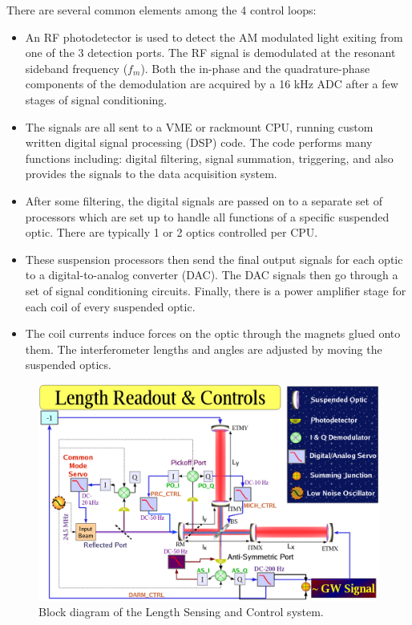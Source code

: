 There are several common elements among the 4 control loops:

\begin{itemize}
\item An RF photodetector is used to detect the AM modulated light
      exiting from one of the 3 detection ports. The RF signal is
      demodulated at the resonant sideband frequency ($f_{m}$).
      Both the in-phase and the quadrature-phase components of the
      demodulation are acquired by a 16 kHz ADC after a few stages
      of signal conditioning.

\item The signals are all sent to a VME or rackmount CPU, running custom
      written digital signal processing (DSP) code. The code performs
      many functions including: digital filtering, signal summation,
      triggering, and also provides the signals to the  data 
      acquisition system.

\item After some filtering, the digital signals are passed on to
      a separate set of processors which are set up to handle
      all functions of a specific suspended optic. There are
      typically 1 or 2 optics controlled per CPU.

\item These suspension processors then send the final output signals
      for each optic to a digital-to-analog converter (DAC). The
      DAC signals then go through a set of signal conditioning
      circuits. Finally, there is a power amplifier stage for each
      coil of every suspended optic.

\item The coil currents induce forces on the optic through the magnets
      glued onto them. The interferometer lengths and angles are 
      adjusted by moving the suspended optics.
      
\end{itemize}

\begin{figure}[!h]
\centerline{\includegraphics[angle=0,width=6.5in]{Figures/Chap5/LSC.png}}
\caption[LSC Block Diagram]{Block diagram of the Length Sensing and Control
                            system.}
\label{fig:LSCblock}
\end{figure}


